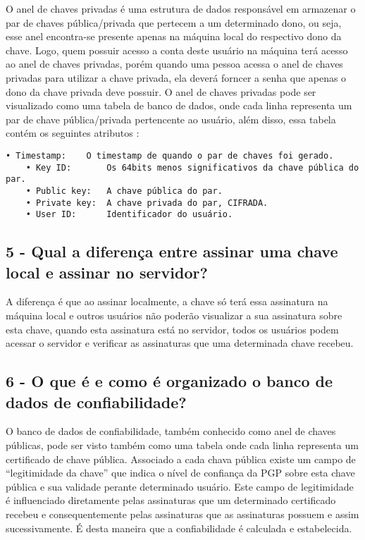 \documentclass[
    article,            %
    11pt,               %
    oneside,            %
    a4paper,            %
    english,            %
    brazil,             %
    sumario=tradicional,
    ]{abntex2}
\begin{document}
O anel de chaves privadas é uma estrutura de dados responsável em armazenar o par de chaves pública/privada que pertecem a um determinado dono, ou seja, esse anel encontra-se presente apenas na máquina local do respectivo dono da chave. Logo, quem possuir acesso a conta deste usuário na máquina terá acesso ao anel de chaves privadas, porém quando uma pessoa acessa o anel de chaves privadas para utilizar a chave privada, ela deverá forncer a senha que apenas o dono da chave privada deve possuir.
O anel de chaves privadas pode ser visualizado como uma tabela de banco de dados, onde cada linha representa um par de chave pública/privada pertencente ao usuário, além disso, essa tabela contém os seguintes atributos \cite{Stallings:2010:CNS:1824151}: 
\begin{Verbatim}[commandchars=\\\{\}, fontsize=\footnotesize]
    • Timestamp:    O timestamp de quando o par de chaves foi gerado.
    • Key ID:       Os 64bits menos significativos da chave pública do par.
    • Public key:   A chave pública do par.
    • Private key:  A chave privada do par, CIFRADA.
    • User ID:      Identificador do usuário.
\end{Verbatim}


\subsection*{\textbf{5 - Qual a diferença entre assinar uma chave local e assinar no servidor?}}

A diferença é que ao assinar localmente, a chave só terá essa assinatura na máquina local e outros usuários não poderão visualizar a sua assinatura sobre esta chave, quando esta assinatura está no servidor, todos os usuários podem acessar o servidor e verificar as assinaturas que uma determinada chave recebeu.

\subsection*{\textbf{6 - O que é e como é organizado o banco de dados de confiabilidade?}}

O banco de dados de confiabilidade, também conhecido como anel de chaves públicas, pode ser visto também como uma tabela onde cada linha representa um certificado de chave pública. Associado a cada chava pública existe um campo de ``legitimidade da chave'' que indica o nível de confiança da PGP sobre esta chave pública e sua validade perante determinado usuário. Este campo de legitimidade é influenciado diretamente pelas assinaturas que um determinado certificado recebeu e consequentemente pelas assinaturas que as assinaturas possuem e assim sucessivamente. É desta maneira que a confiabilidade é calculada e estabelecida. 
\end{document}
